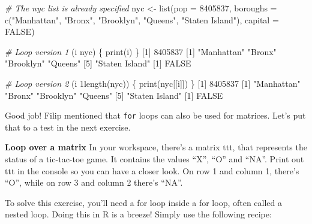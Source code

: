 \documentclass[]{article}
\newcommand{\hlnum}[1]{\textcolor[rgb]{0.816,0.125,0.439}{#1}}%
\newcommand{\hlstr}[1]{\textcolor[rgb]{0.251,0.627,0.251}{#1}}%
\newcommand{\hlcom}[1]{\textcolor[rgb]{0.502,0.502,0.502}{\textit{#1}}}%
\newcommand{\hlstd}[1]{\textcolor[rgb]{0.251,0.251,0.251}{#1}}%
\newcommand{\hlkwc}[1]{\textcolor[rgb]{0.251,0.251,0.251}{#1}}%
\newcommand{\hlkwd}[1]{\textcolor[rgb]{0.878,0.439,0.125}{#1}}%
\newenvironment{Shaded}{\begin{myshaded}}{\end{myshaded}}
\newcommand{\KeywordTok}[1]{\hlkwd{#1}}
\newcommand{\DataTypeTok}[1]{\hlkwc{#1}}
\newcommand{\DecValTok}[1]{\hlnum{#1}}
\newcommand{\StringTok}[1]{\hlstr{#1}}
\newcommand{\CommentTok}[1]{\hlcom{#1}}
\newcommand{\OtherTok}[1]{{#1}}
\newcommand{\NormalTok}[1]{\hlstd{#1}}
\begin{document}
\begin{Shaded}
\begin{Highlighting}[]
\CommentTok{# The nyc list is already specified}
\NormalTok{nyc <-}\StringTok{ }\KeywordTok{list}\NormalTok{(}\DataTypeTok{pop =} \DecValTok{8405837}\NormalTok{, }
\DataTypeTok{boroughs =} \KeywordTok{c}\NormalTok{(}\StringTok{"Manhattan"}\NormalTok{, }\StringTok{"Bronx"}\NormalTok{, }\StringTok{"Brooklyn"}\NormalTok{, }\StringTok{"Queens"}\NormalTok{, }\StringTok{"Staten Island"}\NormalTok{), }
\DataTypeTok{capital =} \OtherTok{FALSE}\NormalTok{)}

\CommentTok{# Loop version 1}
\NormalTok{(i }\NormalTok{ nyc) \{}
\KeywordTok{print}\NormalTok{(i)}
\NormalTok{\}}
\NormalTok{   [}\DecValTok{1}\NormalTok{] }\DecValTok{8405837}
\NormalTok{   [}\DecValTok{1}\NormalTok{] }\StringTok{"Manhattan"}     \StringTok{"Bronx"}         \StringTok{"Brooklyn"}      \StringTok{"Queens"}       
\NormalTok{   [}\DecValTok{5}\NormalTok{] }\StringTok{"Staten Island"}
\NormalTok{   [}\DecValTok{1}\NormalTok{] }\OtherTok{FALSE}



\CommentTok{# Loop version 2}
\NormalTok{(i } \DecValTok{1}\OperatorTok{:}\KeywordTok{length}\NormalTok{(nyc)) \{}
\KeywordTok{print}\NormalTok{(nyc[[i]])}
\NormalTok{\}}
\NormalTok{   [}\DecValTok{1}\NormalTok{] }\DecValTok{8405837}
\NormalTok{   [}\DecValTok{1}\NormalTok{] }\StringTok{"Manhattan"}     \StringTok{"Bronx"}         \StringTok{"Brooklyn"}      \StringTok{"Queens"}       
\NormalTok{   [}\DecValTok{5}\NormalTok{] }\StringTok{"Staten Island"}
\NormalTok{   [}\DecValTok{1}\NormalTok{] }\OtherTok{FALSE}
\end{Highlighting}
\end{Shaded}

Good job! Filip mentioned that \texttt{for} loops can also be used for
matrices. Let's put that to a test in the next exercise.

\textbf{Loop over a matrix} In your workspace, there's a matrix ttt,
that represents the status of a tic-tac-toe game. It contains the values
``X'', ``O'' and ``NA''. Print out ttt in the console so you can have a
closer look. On row 1 and column 1, there's ``O'', while on row 3 and
column 2 there's ``NA''.

To solve this exercise, you'll need a for loop inside a for loop, often
called a nested loop. Doing this in R is a breeze! Simply use the
following recipe:
\end{document}
